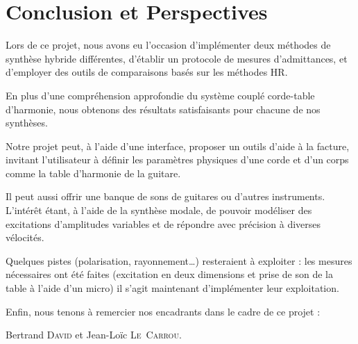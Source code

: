 \chapter*{Conclusion et Perspectives}
Lors de ce projet, nous avons eu l'occasion d'implémenter deux méthodes de synthèse hybride différentes, d'établir un protocole de mesures d'admittances, et d'employer des outils de comparaisons basés sur les méthodes HR.

En plus d'une compréhension approfondie du système couplé corde-table d'harmonie, nous obtenons des résultats satisfaisants pour chacune de nos synthèses.

Notre projet peut, à l'aide d'une interface, proposer un outils d'aide à la facture, invitant l'utilisateur à définir les paramètres physiques d'une corde et d'un corps comme la table d'harmonie de la guitare.

Il peut aussi offrir une banque de sons de guitares ou d'autres instruments. L'intérêt étant, à l'aide de la synthèse modale, de pouvoir modéliser des excitations d'amplitudes variables et de répondre avec précision à diverses vélocités.

Quelques pistes (polarisation, rayonnement\dots) resteraient à exploiter : les mesures nécessaires ont été faites (excitation en deux dimensions et prise de son de la table à l'aide d'un micro) il s'agit maintenant d'implémenter leur exploitation. 
\vspace{3mm}
\begin{center}
Enfin, nous tenons à remercier nos encadrants dans le cadre de ce projet :

Bertrand \textsc{David} et Jean-Loïc \textsc{Le~Carrou}.
\end{center}